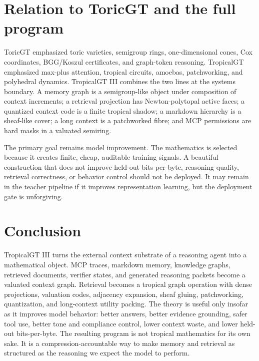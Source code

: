 \documentclass[11pt]{article}
\theoremstyle{definition}
\theoremstyle{remark}
\begin{document}
\section{Relation to ToricGT and the full program}

ToricGT emphasized toric varieties, semigroup rings, one-dimensional cones, Cox coordinates, BGG/Koszul certificates, and graph-token reasoning. TropicalGT emphasized max-plus attention, tropical circuits, amoebas, patchworking, and polyhedral dynamics. TropicalGT III combines the two lines at the systems boundary. A memory graph is a semigroup-like object under composition of context increments; a retrieval projection has Newton-polytopal active faces; a quantized context code is a finite tropical shadow; a markdown hierarchy is a sheaf-like cover; a long context is a patchworked fibre; and MCP permissions are hard masks in a valuated semiring.

The primary goal remains model improvement. The mathematics is selected because it creates finite, cheap, auditable training signals. A beautiful construction that does not improve held-out bits-per-byte, reasoning quality, retrieval correctness, or behavior control should not be deployed. It may remain in the teacher pipeline if it improves representation learning, but the deployment gate is unforgiving.


\section{Conclusion}

TropicalGT III turns the external context substrate of a reasoning agent into a mathematical object. MCP traces, markdown memory, knowledge graphs, retrieved documents, verifier states, and generated reasoning packets become a valuated context graph. Retrieval becomes a tropical graph operation with dense projections, valuation codes, adjacency expansion, sheaf gluing, patchworking, quantization, and long-context utility packing. The theory is useful only insofar as it improves model behavior: better answers, better evidence grounding, safer tool use, better tone and compliance control, lower context waste, and lower held-out bits-per-byte. The resulting program is not tropical mathematics for its own sake. It is a compression-accountable way to make memory and retrieval as structured as the reasoning we expect the model to perform.
\end{document}
